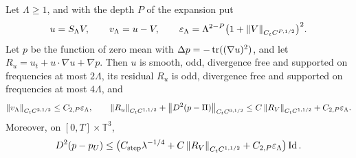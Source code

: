 \begin{proposition}\label{cc:uf:step:thm:step}
Let $\Lambda\ge1$, and with the depth $P$ of the expansion put
\begin{equation}\label{cc:uf:step:eq:truncation}
 u=S_\Lambda V,\qquad v_\Lambda=u-V,\qquad
 \varepsilon_\Lambda=\Lambda^{2-P}
 \bigl(1+\left\lVert V\right\rVert_{C_tC^{P,1/2}}\bigr)^2 .
\end{equation}
Let $p$ be the function of zero mean with
$\Delta p=-\operatorname{tr}((\nabla u)^2)$, and let
$R_u=u_t+u\cdot\nabla u+\nabla p$. Then $u$ is smooth, odd, divergence
free and supported on frequencies at most $2\Lambda$, its residual $R_u$ is odd,
divergence free and supported on frequencies at most $4\Lambda$, and
\begin{equation}\label{cc:uf:step:eq:truncated}
 \left\lVert v_\Lambda\right\rVert_{C_tC^{2,1/2}}\le C_{2,P}\varepsilon_\Lambda,\qquad
 \left\lVert R_u\right\rVert_{C_tC^{1,1/2}}+\left\lVert D^2(p-\Pi)\right\rVert_{C_tC^{0,1/2}}
 \le C\left\lVert R_V\right\rVert_{C_tC^{1,1/2}}+C_{2,P}\varepsilon_\Lambda .
\end{equation}
Moreover, on $[0,T]\times\mathbb T^3$,
\begin{equation}\label{cc:uf:step:eq:pressure-error}
 D^2(p-p_U)\le\bigl(C_{\rm step}\lambda^{-1/4}
   +C\left\lVert R_V\right\rVert_{C_tC^{1,1/2}}+C_{2,P}\varepsilon_\Lambda\bigr)\operatorname{Id} .
\end{equation}
\end{proposition}
